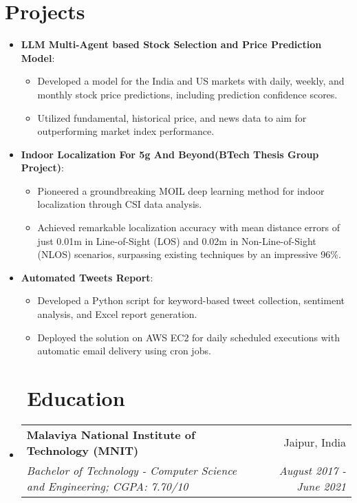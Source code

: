 \documentclass[a4paper,20pt]{article}
\makeatletter
\newcommand{\resumeItem}[2]{
  \item\small{
    \textbf{#1}{: #2 \vspace{-2pt}}
  }
}
\newcommand{\resumeSubheading}[4]{
  \vspace{-1pt}\item
    \begin{tabular*}{0.97\textwidth}{l@{\extracolsep{\fill}}r}
      \textbf{#1} & #2 \\
      \textit{#3} & \textit{#4} \\
    \end{tabular*}\vspace{-5pt}
}
\newcommand{\resumeSubItem}[2]{\resumeItem{#1}{#2}\vspace{-3pt}}
\newcommand{\resumeSubHeadingListStart}{\begin{itemize}[leftmargin=*]}
\newcommand{\resumeSubHeadingListEnd}{\end{itemize}}
\makeatother
\begin{document}
\vspace{-3pt}
\section{Projects}
\resumeSubHeadingListStart
\resumeSubItem{LLM Multi-Agent based Stock Selection and Price Prediction Model}{}
\vspace{-2pt}
\begin{itemize}[label=$\circ$]
\item Developed a model for the India and US markets with daily, weekly, and monthly stock price predictions, including prediction confidence scores.
\vspace{-3pt}
\item Utilized fundamental, historical price, and news data to aim for outperforming market index performance.
\end{itemize}
\vspace{-8pt}
\resumeSubItem{Indoor Localization For 5g And Beyond(BTech Thesis Group Project)}{}
\vspace{-2pt}
\begin{itemize}[label=$\circ$]
\item Pioneered a groundbreaking MOIL deep learning method for indoor localization through CSI data analysis.
\vspace{-3pt}
\item Achieved remarkable localization accuracy with mean distance errors of just 0.01m in Line-of-Sight (LOS) and 0.02m in Non-Line-of-Sight (NLOS) scenarios, surpassing existing techniques by an impressive 96\%.
\end{itemize}
\vspace{-8pt}
\resumeSubItem{Automated Tweets Report}{}
\vspace{-2pt}
\begin{itemize}[label=$\circ$]
\item Developed a Python script for keyword-based tweet collection, sentiment analysis, and Excel report generation.
\vspace{-3pt}
\item Deployed the solution on AWS EC2 for daily scheduled executions with automatic email delivery using cron jobs.
\end{itemize}
\vspace{-2pt}
\resumeSubHeadingListEnd

\section{~~Education}
  \resumeSubHeadingListStart
    \resumeSubheading
      {Malaviya National Institute of Technology (MNIT)}{Jaipur, India}
      {Bachelor of Technology - Computer Science and Engineering;  CGPA: 7.70/10}{August 2017 - June 2021}
    \resumeSubHeadingListEnd
	
\end{document}
